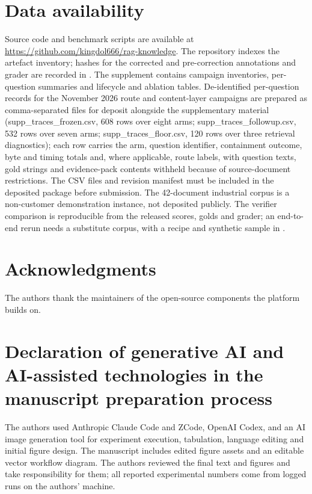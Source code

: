 \section*{Data availability}
Source code and benchmark scripts are available at
\url{https://github.com/kingdol666/rag-knowledge}. The repository indexes the
artefact inventory; hashes for the corrected and pre-correction annotations
and grader are recorded in
.
The supplement contains campaign inventories, per-question summaries and
lifecycle and ablation tables. De-identified per-question records for the
November 2026 route and content-layer campaigns are prepared as
comma-separated files for deposit alongside the supplementary material
(supp\_traces\_frozen.csv, 608 rows over eight arms;
supp\_traces\_followup.csv, 532 rows over seven arms;
supp\_traces\_floor.csv, 120 rows over three retrieval diagnostics); each row
carries the arm, question identifier, containment outcome, byte and timing
totals and, where applicable, route labels, with question texts, gold strings and evidence-pack
contents withheld because of source-document restrictions. The CSV files and
revision manifest must be included in the deposited package before submission.
The 42-document industrial corpus is a non-customer demonstration instance,
not deposited publicly. The verifier comparison is reproducible from the
released scores, golds and grader; an end-to-end rerun needs a substitute
corpus, with a recipe and synthetic sample in
.

\section*{Acknowledgments}
The authors thank the maintainers of the open-source components the platform
builds on. %

\section*{Declaration of generative AI and AI-assisted technologies in the manuscript preparation process}
The authors used Anthropic Claude Code and ZCode, OpenAI Codex, and an AI image
generation tool for experiment execution, tabulation, language editing and initial figure
design. The manuscript includes edited figure assets and an editable vector workflow diagram. The
authors reviewed the final text and figures and take responsibility for them;
all reported experimental numbers come from logged runs on the authors'
machine.

